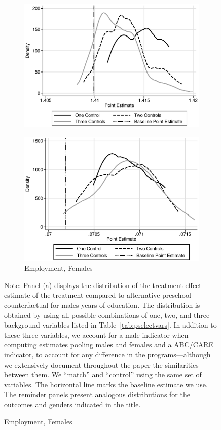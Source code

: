 \begin{figure}
\begin{subfigure}[h]{0.4\textwidth}
		\includegraphics[width=\textwidth]{output/sencontrols_female_years_30y_epan_ipw_P1.eps}
\end{subfigure}%
\begin{subfigure}[h]{0.4\textwidth}
	\centering
	\caption{Employment, Females}
		\includegraphics[width=\textwidth]{output/sencontrols_female_si30y_works_epan_ipw_P1.eps}
\end{subfigure}
\footnotesize \justify
Note: Panel (a) displays the distribution of the treatment effect estimate of the treatment compared to alternative preschool counterfactual for males years of education. The distribution is obtained by using all possible combinations of one, two, and three background variables listed in Table~\ref{tab:pselectvars}. In addition to these three variables, we account for a male indicator when computing estimates pooling males and females and a ABC/CARE indicator, to account for any difference in the programs---although we extensively document throughout the paper the similarities between them. We ``match'' and ``control'' using the same set of variables. The horizontal line marks the baseline estimate we use. The reminder panels present analogous distributions for the outcomes and genders indicated in the title.\\
\end{figure}



